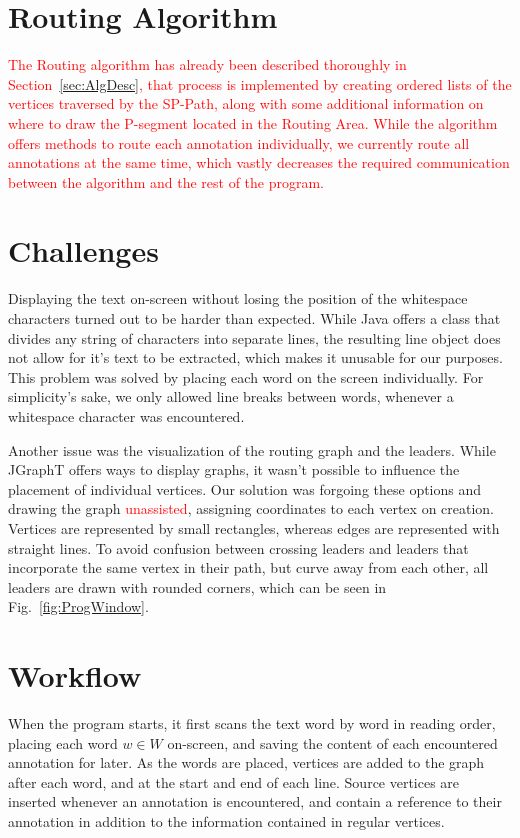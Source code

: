 \documentclass[11pt,a4paper]{vutinfth}
\newcommand{\change}[1]{\textcolor{red}{#1}}
\begin{document}
\section{Routing Algorithm}

\change{The Routing algorithm has already been described thoroughly in Section~\ref{sec:AlgDesc}, that process is implemented by creating ordered lists of the vertices traversed by the SP-Path, along with some additional information on where to draw the P-segment located in the Routing Area. While the algorithm offers methods to route each annotation individually, we currently route all annotations at the same time, which vastly decreases the required communication between the algorithm and the rest of the program.}

\section{Challenges}
\label{sec:Challenge}
Displaying the text on-screen without losing the position of the whitespace characters turned out to be harder than expected. While Java offers a class that divides any string of characters into separate lines, the resulting line object does not allow for it's text to be extracted, which makes it unusable for our purposes. This problem was solved by placing each word on the screen individually. For simplicity's sake, we only allowed line breaks between words, whenever a whitespace character was encountered.

Another issue was the visualization of the routing graph and the leaders. While JGraphT offers ways to display graphs, it wasn't possible to influence the placement of individual vertices. Our solution was forgoing these options and drawing the graph \change{unassisted}, assigning coordinates to each vertex on creation. Vertices are represented by small rectangles, whereas edges are represented with straight lines. To avoid confusion between crossing leaders and leaders that incorporate the same vertex in their path, but curve away from each other, all leaders are drawn with rounded corners, which can be seen in Fig.~\ref{fig:ProgWindow}.


\section{Workflow}%

When the program starts, it first scans the text word by word in reading order, placing each word $w \in W$  on-screen, and saving the content of each encountered annotation for later. As the words are placed, vertices are added to the graph after each word, and at the start and end of each line. Source vertices are inserted whenever an annotation is encountered, and contain a reference to their annotation in addition to the information contained in regular vertices.
\end{document}
